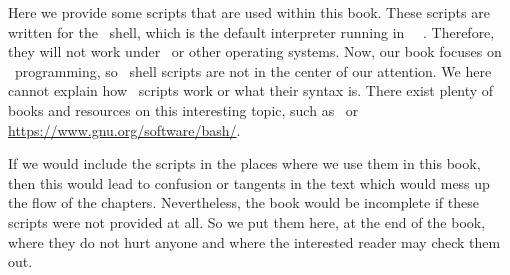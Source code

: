 %
%
%
%
%
%
%
%
%
%
%
%
Here we provide some scripts that are used within this book.
These scripts are written for the \bash\ shell, which is the default interpreter running in \ubuntu\ \linux\ .
Therefore, they will not work under \microsoftWindows\ or other operating systems.
Now, our book focuses on \python\ programming, so \bash\ shell scripts are not in the center of our attention.
We here cannot explain how \bash\ scripts work or what their syntax is.
There exist plenty of books and resources on this interesting topic, such as~\cite{NR2005LTBSUSPCB3,Z2017MB,BN2018BC} or \url{https://www.gnu.org/software/bash/}.

If we would include the scripts in the places where we use them in this book, then this would lead to confusion or tangents in the text which would mess up the flow of the chapters.
Nevertheless, the book would be incomplete if these scripts were not provided at all.
So we put them here, at the end of the book, where they do not hurt anyone and where the interested reader may check them out.


